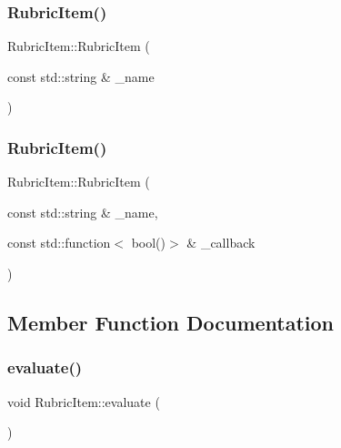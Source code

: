 \hypertarget{class_rubric_item_a983d89dd363b56df35c0685c083e7172}{}\label{class_rubric_item_a983d89dd363b56df35c0685c083e7172} 
\subsubsection{\texorpdfstring{Rubric\+Item()}{RubricItem()}\hspace{0.1cm}{\footnotesize\ttfamily [3/4]}}
{\footnotesize\ttfamily Rubric\+Item\+::\+Rubric\+Item (\begin{DoxyParamCaption}\item[{const std\+::string \&}]{\+\_\+name }\end{DoxyParamCaption})\hspace{0.3cm}{\ttfamily [inline]}}

\hypertarget{class_rubric_item_ae2ff2692b1eb2250e76d3da3fe6fbe79}{}\label{class_rubric_item_ae2ff2692b1eb2250e76d3da3fe6fbe79} 
\subsubsection{\texorpdfstring{Rubric\+Item()}{RubricItem()}\hspace{0.1cm}{\footnotesize\ttfamily [4/4]}}
{\footnotesize\ttfamily Rubric\+Item\+::\+Rubric\+Item (\begin{DoxyParamCaption}\item[{const std\+::string \&}]{\+\_\+name,  }\item[{const std\+::function$<$ bool()$>$ \&}]{\+\_\+callback }\end{DoxyParamCaption})\hspace{0.3cm}{\ttfamily [inline]}}



\subsection{Member Function Documentation}
\hypertarget{class_rubric_item_a83b1d15314c14b6e67207f086d7fa6a5}{}\label{class_rubric_item_a83b1d15314c14b6e67207f086d7fa6a5} 
\subsubsection{\texorpdfstring{evaluate()}{evaluate()}}
{\footnotesize\ttfamily void Rubric\+Item\+::evaluate (\begin{DoxyParamCaption}{ }\end{DoxyParamCaption})}

